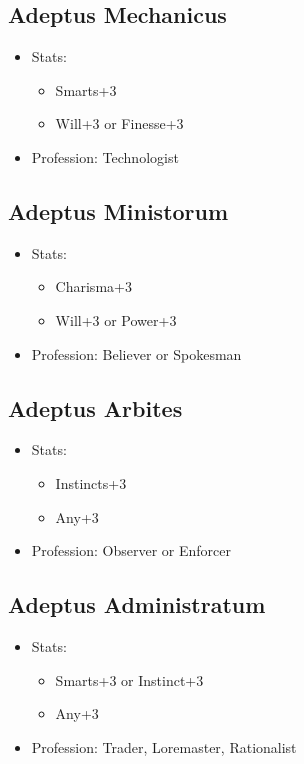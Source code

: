 \subsection{Adeptus Mechanicus}
\begin{itemize}
	\item Stats:
	\begin{itemize}
		\item Smarts+3
		\item Will+3 or Finesse+3
	\end{itemize}
	\item Profession: Technologist
\end{itemize}

\subsection{Adeptus Ministorum}
\begin{itemize}
	\item Stats:
	\begin{itemize}
		\item Charisma+3
		\item Will+3 or Power+3
	\end{itemize}
	\item Profession: Believer or Spokesman
\end{itemize}

\subsection{Adeptus Arbites}
\begin{itemize}
	\item Stats:
	\begin{itemize}
		\item Instincts+3
		\item Any+3
	\end{itemize}
	\item Profession: Observer or Enforcer
\end{itemize}

\subsection{Adeptus Administratum}
\begin{itemize}
	\item Stats:
	\begin{itemize}
		\item Smarts+3 or Instinct+3
		\item Any+3
	\end{itemize}
	\item Profession: Trader, Loremaster, Rationalist
\end{itemize}

